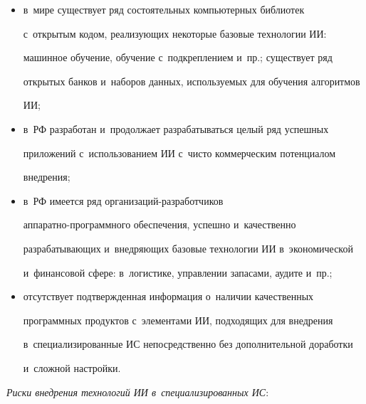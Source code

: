 \begin{itemize}

\item в~мире существует ряд состоятельных компьютерных библиотек 

с~открытым кодом, реализующих некоторые базовые технологии ИИ: 

машинное обуче\-ние, обучение с~подкреплением и~пр.; существует ряд 

открытых банков и~наборов данных, используемых для обучения алгоритмов 

ИИ; 

\item в~РФ разработан и~продолжает разрабатываться целый ряд успешных 

приложений с~использованием ИИ с~чисто коммерческим потенциалом 

внедрения;

\item в~РФ имеется ряд организаций-разработчиков  

ап\-па\-рат\-но-про\-грам\-мно\-го обеспечения, успешно и~качественно 

разрабатывающих и~внедряющих базовые технологии ИИ в~экономической 

и~финансовой сфере: в~логистике, управлении запасами, аудите и~пр.;

\item отсутствует подтвержденная информация о~наличии качественных 

про\-граммных продуктов с~элементами ИИ, подходящих для внедрения 

в~специализированные ИС непосредственно без дополнительной доработки 

и~сложной настройки.

  \end{itemize}

  

  \textit{Риски внедрения технологий ИИ в~специализированных ИС}:

